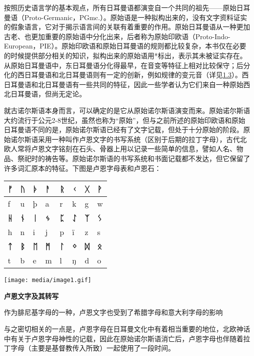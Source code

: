 按照历史语言学的基本观点，所有日耳曼语都演变自一个共同的祖先------原始日耳曼语（Proto-Germanic，PGmc.）。原始语是一种拟构出来的，没有文字资料证实的假象语言，它对于揭示语言间的关联有着重要的作用。原始日耳曼语从一种更加古老、也更加重要的原始语中分化出来，后者称为原始印欧语（Proto-Indo-European，PIE）。原始印欧语和原始日耳曼语的规则都比较复杂，本书仅在必要的时候提供部分相关的知识，拟构出来的原始语用*标出，表示其未被证实存在。从原始日耳曼语中，东日耳曼语分化得最早，在音变等特征上相对比较保守；后分化的西日耳曼语和北日耳曼语则有一定的创新，例如规律的变元音（详见\hyperref[ux53d8ux5143ux97f3]{1.3}）。西日耳曼语和北日耳曼语有一些共同的特征，因此一些学者认为它们来自一种原始西北日耳曼语，但尚无定论。

就古诺尔斯语本身而言，可以确定的是它从原始诺尔斯语演变而来。原始诺尔斯语大约流行于公元2-8世纪，虽然也称为``原始''，但与之前所述的原始印欧语和原始日耳曼语不同的是，原始诺尔斯语已经有了文字记载，但处于十分原始的阶段。原始诺尔斯语采用一种叫作卢恩文字的书写系统（区别于后期的拉丁字母），古代北欧人常将卢恩文字铭刻在石头、骨器上用以记录一些简单的信息，譬如人名、物品、祭祀时的祷告等。原始诺尔斯语的书写系统和书面记载都不发达，但它保留了许多词汇原本的特征。下图是卢恩字母表和卢恩石：

\begin{longtable}{llllllll}
\toprule
\textbf{ᚠ} & \textbf{ᚢ} & \textbf{ᚦ} & \textbf{ᚨ} & \textbf{ᚱ} & \textbf{ᚲ} & \textbf{ᚷ} & \textbf{ᚹ} \\
\midrule
\endhead
\bottomrule
\endfoot
f & u & þ & a & r & k & g & w \\
\textbf{ᚺ} & \textbf{ᚾ} & \textbf{ᛁ} & \textbf{ᛃ} & \textbf{ᛈ} &
\textbf{ᛇ} & \textbf{ᛉ} & \textbf{ᛊ} \\
h & n & i & j & p & ï & z & s \\
\textbf{ᛏ} & \textbf{ᛒ} & \textbf{ᛖ} & \textbf{ᛗ} & \textbf{ᛚ} &
\textbf{ᛜ} & \textbf{ᛞ} & \textbf{ᛟ} \\
t & b & e & m & l & ŋ & d & o \\
\end{longtable}

\texttt{[image: media/image1.gif]}

\textbf{卢恩文字及其转写}

作为腓尼基字母的一种，卢恩文字也受到了希腊字母和意大利字母的影响

与之密切相关的一点是，卢恩字母在日耳曼文化中有着相当重要的地位，北欧神话中有关于卢恩字母神性的记载，因此在原始诺尔斯语消亡后，卢恩字母也伴随着拉丁字母（主要是基督教传入所致）一起使用了一段时间。

